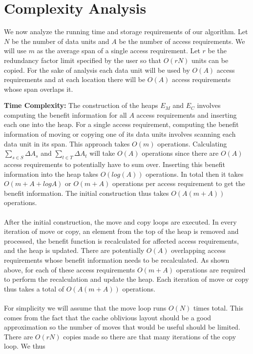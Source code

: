 \section{Complexity Analysis}

We now analyze the running time and storage requirements of our algorithm. Let
$N$ be the number of data units and $A$ be the number of access requirements.
We will use $m$ as the average span of a single access requirement. Let $r$ be the redundancy factor limit specified by the user so that $O(rN)$ units can be copied. For the sake of analysis each data unit will be used by $O(A)$ access requirements and at each location there will be $O(A)$ access requirements whose span overlaps it.

{\bf Time Complexity:} The construction of the heaps $E_M$ and $E_C$ involves
computing the benefit information for all $A$ access requirements and inserting
each one into the heap. For a single access requirement, computing the benefit information of moving or copying one of its data units involves scanning each data unit in its span. This approach takes $O(m)$ operations. Calculating $\sum_{s\in S}\Delta{A_s}$ and $\sum_{t\in T}\Delta{A_t}$ will take $O(A)$ operations since there are $O(A)$ access requirements to potentially have to sum over. Inserting this
benefit information into the heap takes $O(log (A))$ operations. In total then it takes $O(m + A + logA)$ or $O(m + A)$ operations per access requirement to get the benefit information. The initial construction thus takes $O(A(m+A))$ operations. \\
\\
After the initial construction, the move and copy loops are executed. In every iteration of move or copy, an element from the top of the heap is removed and processed, the benefit function is recalculated for affected access requirements, and the heap is updated. There are potentially $O(A)$ overlapping access requirements whose benefit information needs to be recalculated. As shown above, for each of these access requirements $O(m+A)$ operations are required to perform the recalculation and update the heap. Each iteration of move or copy thus takes a total of $O(A(m+A))$ operations.\\
\\
For simplicity we will assume that the move loop runs $O(N)$ times total. This comes from the fact that the
cache oblivious layout \cite{cacheobliviouslayout} should be a good
approximation so the number of moves that would be useful should be
limited. There are $O(rN)$ copies made so there are that many iterations of the copy loop. We thus
